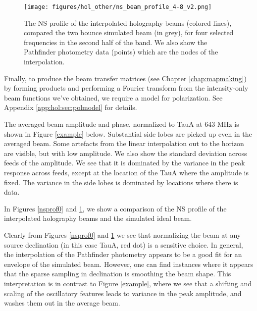 \begin{figure}[h!]
\begin{center}
\texttt{[image: figures/hol\_other/ns\_beam\_profile\_4-8\_v2.png]}
\caption{The NS profile of the interpolated holography beams (colored lines), compared the two bounce simulated beam (in grey), for four selected frequencies in the second half of the band. We also show the Pathfinder photometry data (points) which are the nodes of the interpolation. \label{nsprof1}}
\end{center}
\end{figure}

Finally, to produce the beam transfer matrices (see Chapter \ref{chap:mapmaking}) by forming products and performing a Fourier transform from the intensity-only beam functions we've obtained, we require a model for polarization. See Appendix \ref{app:hol:sec:polmodel} for details.

The averaged beam amplitude and phase, normalized to TauA at 643 MHz is shown in Figure \ref{example} below. Substantial side lobes are picked up even in the averaged beam. Some artefacts from the linear interpolation out to the horizon are visible, but with low amplitude. We also show the standard deviation across feeds of the amplitude. We see that it is dominated by the variance in the peak response across feeds, except at the location of the TauA where the amplitude is fixed. The variance in the side lobes is dominated by locations where there is data.

In Figures \ref{nsprof0} and \ref{nsprof1}, we show a comparison of the NS profile of the interpolated holography beams and the simulated ideal beam.

Clearly from Figures \ref{nsprof0} and \ref{nsprof1} we see that normalizing the beam at any source declination (in this case TauA, red dot) is a sensitive choice. In general, the interpolation of the Pathfinder photometry appears to be a good fit for an envelope of the simulated beam. However, one can find instances where it appears that the sparse sampling in declination is smoothing the beam shape. This interpretation is in contrast to Figure \ref{example}, where we see that a shifting and scaling of the oscillatory features leads to variance in the peak amplitude, and washes them out in the average beam.


